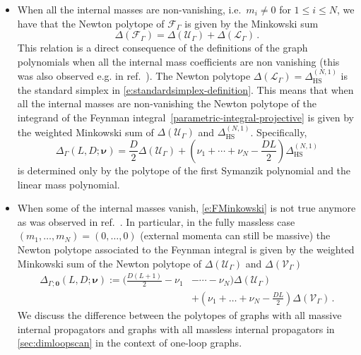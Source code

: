 \documentclass[12pt,a4paper]{article}
\theoremstyle{plain}
\theoremstyle{remark}
\newcommand{\nprops}{N}
\newcommand{\sumnus}{\nu_1+\dots+\nu_{\nprops}}
\newcommand{\cU}{\mathscr {U}}
\newcommand{\cF}{\mathscr {F}}
\newcommand{\cV}{\mathscr {V}}
\newcommand{\cL}{\mathscr {L}}
\newcommand{\undernotation}[1]{\pmb{#1}}
\newcommand{\Newton}{\Delta}
\newcommand{\simplexwithpars}[1]{\Newton_{\text{HS}}^{(#1)}}
\begin{document}
		\begin{itemize}
			\item
			When all the internal masses are non-vanishing, i.e.\ $m_i\neq0$ for
			$1\leq i\leq \nprops$, we have that the Newton polytope of $\cF_\Gamma$ is
			given by the Minkowski sum
			\begin{equation}\label{e:FMinkowski}
				\Newton(  \cF_\Gamma) =\Newton(\cU_\Gamma)+\Newton(\cL_\Gamma)\, .
			\end{equation}
			This relation  is a direct consequence of the definitions of the graph polynomials when all the internal mass coefficients are non vanishing (this was also observed  e.g. in ref.~\cite{Arkani-Hamed:2022cqe,Borinsky:2023jdv}).  
             The Newton polytope $\Newton(\cL_\Gamma)=\simplexwithpars{\nprops,1}$ is the standard
simplex in \cref{e:standardsimplex-definition}.
			This means that when all the internal masses are non-vanishing the
			Newton polytope of the integrand of the Feynman integral~\eqref{parametric-integral-projective}
            is given by the weighted Minkowski sum of $\Newton (\cU_\Gamma)$ and $\simplexwithpars{\nprops,1}$. Specifically,
            \begin{equation}\label{e:NewtonUFMassive}
				\Delta_\Gamma(L,D;\undernotation{\nu}) =
				\frac{D}{2}
				\Newton (\cU_\Gamma)+\left(\nu_1+\cdots+\nu_\nprops-\frac{DL}
				2\right)\simplexwithpars{\nprops,1}                
			\end{equation}
			is determined only by the polytope of the first Symanzik polynomial
			and the linear mass polynomial.
			
\item			When some of the internal masses vanish, 
			\cref{e:FMinkowski} is not true anymore as was observed in ref.~\cite[Remark 4.16]{Schultka:2018nrs}. In particular, in the fully
			massless case $(m_1,\dots,m_\nprops)=(0,\dots,0)$ (external momenta can still be massive) the Newton polytope
			associated to the Feynman integral is given by the weighted Minkowski sum of the Newton
			polytope of $\Newton (\cU_\Gamma)$ and  $\Newton(\cV_\Gamma)$
			\begin{equation}
            \begin{aligned}
				\label{e:NewtonUFMassless}
				\Delta_{\Gamma;\undernotation 0}(L,D;\undernotation{\nu}):=    \bigg(\frac{D(L+1)}{2}-\nu_1&-\cdots-\nu_\nprops\bigg)
				\Newton (\cU_\Gamma)\\
                &+\left(\sumnus-\frac{DL}
				2\right)\Newton(\cV_\Gamma)\, .
			\end{aligned}
            \end{equation}
			We discuss the difference between the polytopes of graphs with all
            massive internal propagators and graphs with all massless internal propagators in \cref{sec:dimloopscan} in the context of one-loop graphs.


\end{itemize}
\end{document}
